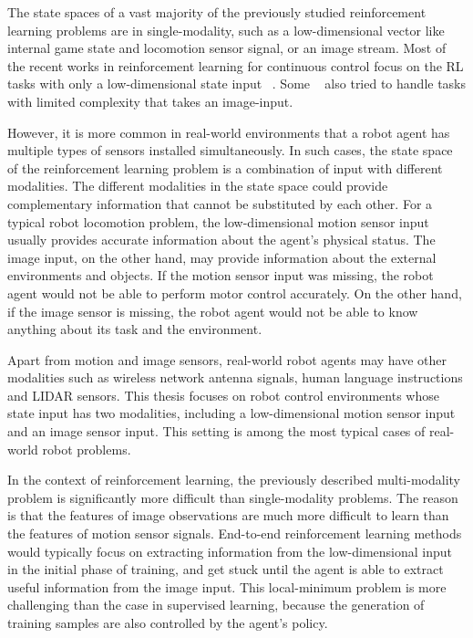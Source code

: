 The state spaces of a vast majority of the previously studied reinforcement learning problems are in single-modality, such as a low-dimensional vector like internal game state and locomotion sensor signal, or an image stream. Most of the recent works in reinforcement learning for continuous control focus on the RL tasks with only a low-dimensional state input ~\cite{duan2016benchmarking}. Some ~\cite{wu2017scalable} also tried to handle tasks with limited complexity that takes an image-input.

However, it is more common in real-world environments that a robot agent has multiple types of sensors installed simultaneously. In such cases, the state space of the reinforcement learning problem is a combination of input with different modalities. The different modalities in the state space could provide complementary information that cannot be substituted by each other. For a typical robot locomotion problem, the low-dimensional motion sensor input usually provides accurate information about the agent's physical status. The image input, on the other hand, may provide information about the external environments and objects. If the motion sensor input was missing, the robot agent would not be able to perform motor control accurately. On the other hand, if the image sensor is missing, the robot agent would not be able to know anything about its task and the environment.


Apart from motion and image sensors, real-world robot agents may have other modalities such as wireless network antenna signals, human language instructions and LIDAR sensors. This thesis focuses on robot control environments whose state input has two modalities, including a low-dimensional motion sensor input and an image sensor input. This setting is among the most typical cases of real-world robot problems.

In the context of reinforcement learning, the previously described multi-modality problem is significantly more difficult than single-modality problems. The reason is that the features of image observations are much more difficult to learn than the features of motion sensor signals. End-to-end reinforcement learning methods would typically focus on extracting information from the low-dimensional input in the initial phase of training, and get stuck until the agent is able to extract useful information from the image input. This local-minimum problem is more challenging than the case in supervised learning, because the generation of training samples are also controlled by the agent's policy.

